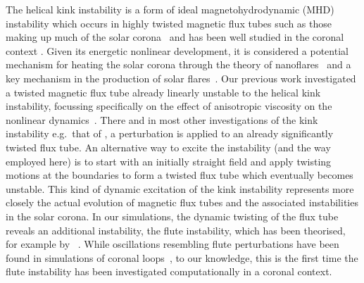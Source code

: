 \documentclass[fleqn,usenatbib]{mnras}
\newcommand{\rev}[1]{{\color{red} {#1}}}
\newcommand{\revcite}[1]{{\color{red} \underline{#1}}}
\begin{document}
The helical kink instability is a form of ideal magnetohydrodynamic (MHD)
instability which occurs in highly twisted magnetic flux tubes such as those
making up much of the solar corona~\citep{realeCoronalLoopsObservations2014}
and has been well studied in the coronal
context
\citep{hoodKinkInstabilitySolar1979,
  hoodCoronalHeatingMagnetic2009,
  browningSolarCoronalHeating2003b,
  Torok2003, Torok2004, Torok2005,
  barefordShockHeatingNumerical2015,
  quinnEffectAnisotropicViscosity2020}.
Given its energetic nonlinear development, it is considered a potential
mechanism for heating the solar corona through the theory of
nanoflares~\citep{klimchukSolvingCoronalHeating2006,browningMechanismsSolarCoronal1991}
and a key mechanism in the production of solar
flares~\citep{hoodKinkInstabilitySolar1979}. \rev{Our previous work}
investigated a twisted magnetic flux tube already linearly unstable to
the 
helical kink instability, focussing specifically on the effect of anisotropic
viscosity on the nonlinear
dynamics~\citep{quinnEffectAnisotropicViscosity2020}.
\rev{There and in} most other investigations of
the kink instability e.g.~that of \revcite{\citet{hoodCoronalHeatingMagnetic2009}},
a perturbation is applied to an already significantly twisted flux tube. An
alternative way to excite the instability (and the way employed here) is to
start with an initially straight field and apply twisting motions at the
boundaries to form a twisted flux tube which eventually becomes unstable. This
kind of dynamic excitation of the kink instability \rev{}
represents more closely the actual evolution of magnetic flux tubes and the
associated instabilities in the solar corona. In our simulations, the dynamic
twisting of the flux tube reveals an additional instability, the flute
instability, which has been theorised, for example
by~\revcite{\citet{priestMagnetohydrodynamicsSun2013}}. While oscillations resembling
flute perturbations have been found in simulations of coronal
loops~\citep{terradasEffectMagneticTwist2018}, to our knowledge, this is the
first time the flute instability has been investigated computationally in
a coronal context.
\end{document}
